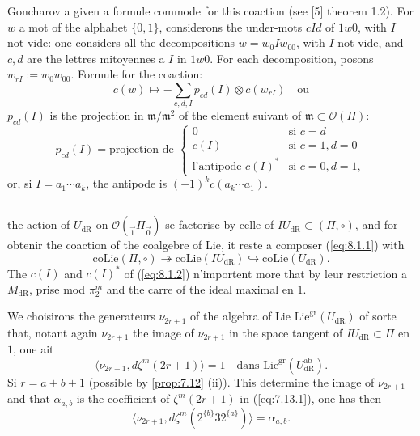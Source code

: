 \documentclass[11pt,a4paper]{article}
\theoremstyle{plain}
\theoremstyle{definition}
\newcommand{\dR}{\mathrm{dR}}
\newcommand{\gr}{\mathrm{gr}}
\newcommand{\coLie}{\mathrm{coLie}}
\newcommand{\ab}{\mathrm{ab}}
\begin{document}
Goncharov a given a formule commode for this coaction (see [5] theorem 1.2). For $w$ a mot of the alphabet $\{0,1\}$, considerons the under-mots $cId$ of $1w0$, with $I$ not vide: one considers all the decompositions $w = w_0 I w_{00}$, with $I$ not vide, and $c,d$ are the lettres mitoyennes a $I$ in $1w0$. For each decomposition, posons $w_{rI} := w_0 w_{00}$. Formule for the coaction:
\begin{equation}\label{eq:8.1.1}
c(w) \mapsto -\sum_{c,d,I} p_{cd}(I) \otimes c(w_{rI}) \quad \text{ou}
\end{equation}
$p_{cd}(I)$ is the projection in $\mathfrak{m}/\mathfrak{m}^2$ of the element suivant of $\mathfrak{m} \subset \mathcal{O}(\Pi)$:
\begin{equation}\label{eq:8.1.2}
p_{cd}(I) = \text{projection de } \begin{cases} 0 & \text{si } c = d \\ c(I) & \text{si } c = 1, d = 0 \\ \text{l'antipode } c(I)^* & \text{si } c = 0, d = 1, \end{cases}
\end{equation}
or, si $I = a_1 \cdots a_k$, the antipode is $(-1)^k c(a_k \cdots a_1)$.

\subsection{}\label{ssec:8.2}

the action of $U_{\dR}$ on $\mathcal{O}({}_{\vec{1}}\Pi_{\vec{0}})$ se factorise by celle of $IU_{\dR} \subset (\Pi, \circ)$, and for obtenir the coaction of the coalgebre of Lie, it reste a composer (\ref{eq:8.1.1}) with
\[
\coLie(\Pi, \circ) \twoheadrightarrow \coLie(IU_{\dR}) \hookrightarrow \coLie(U_{\dR}).
\]
The $c(I)$ and $c(I)^*$ of (\ref{eq:8.1.2}) n'importent more that by leur restriction a $M_{\dR}$, prise mod $\pi_2^m$ and the carre of the ideal maximal en $1$.

We choisirons the generateurs $\nu_{2r+1}$ of the algebra of Lie $\mathrm{Lie}^{\gr}(U_{\dR})$ of sorte that, notant again $\nu_{2r+1}$ the image of $\nu_{2r+1}$ in the space tangent of $IU_{\dR} \subset \Pi$ en $1$, one ait
\[
\langle \nu_{2r+1}, d\zeta^m(2r+1) \rangle = 1 \quad \text{dans } \mathrm{Lie}^{\gr}(U_{\dR}^{\ab}).
\]
Si $r = a+b+1$ (possible by \ref{prop:7.12} (ii)). This determine the image of $\nu_{2r+1}$ and that $\alpha_{a,b}$ is the coefficient of $\zeta^m(2r+1)$ in (\ref{eq:7.13.1}), one has then
\[
\langle \nu_{2r+1}, d\zeta^m(2^{\{b\}} 3 2^{\{a\}}) \rangle = \alpha_{a,b}.
\]
\end{document}

